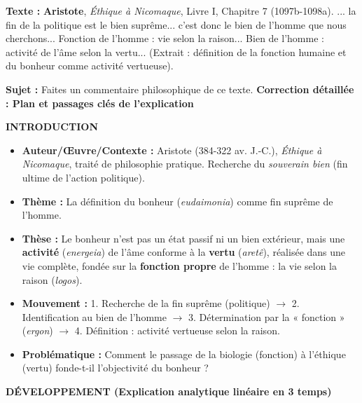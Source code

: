 \documentclass[11pt]{article}
\begin{document}
\begin{exoresolu}
\textbf{Texte :} \textbf{Aristote}, \emph{Éthique à Nicomaque}, Livre I, Chapitre 7 (1097b-1098a). \guillemotleft ... la fin de la politique est le bien suprême... c'est donc le bien de l'homme que nous cherchons... Fonction de l'homme : vie selon la raison... Bien de l'homme : activité de l'âme selon la vertu... \guillemotright (Extrait : définition de la fonction humaine et du bonheur comme activité vertueuse).

\textbf{Sujet :} Faites un commentaire philosophique de ce texte.
\tcblower
\textbf{Correction détaillée : Plan et passages clés de l'explication}

\textbf{INTRODUCTION}
\begin{itemize}
    \item \textbf{Auteur/Œuvre/Contexte :} Aristote (384-322 av. J.-C.), \emph{Éthique à Nicomaque}, traité de philosophie pratique. Recherche du \emph{souverain bien} (fin ultime de l'action politique).
    \item \textbf{Thème :} La définition du bonheur (\emph{eudaimonia}) comme fin suprême de l'homme.
    \item \textbf{Thèse :} Le bonheur n'est pas un état passif ni un bien extérieur, mais une \textbf{activité} (\emph{energeia}) de l'âme conforme à la \textbf{vertu} (\emph{aretê}), réalisée dans une vie complète, fondée sur la \textbf{fonction propre} de l'homme : la vie selon la raison (\emph{logos}).
    \item \textbf{Mouvement :} 1. Recherche de la fin suprême (politique) $\rightarrow$ 2. Identification au bien de l'homme $\rightarrow$ 3. Détermination par la « fonction » (\emph{ergon}) $\rightarrow$ 4. Définition : activité vertueuse selon la raison.
    \item \textbf{Problématique :} Comment le passage de la biologie (fonction) à l'éthique (vertu) fonde-t-il l'objectivité du bonheur ?
\end{itemize}

\textbf{DÉVELOPPEMENT (Explication analytique linéaire en 3 temps)}


\end{exoresolu}
\end{document}
